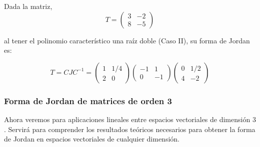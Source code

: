 \bigskip

\begin{example}
Dada la matriz, 
$$T= \left(\begin{array}{cc} 3 & -2  \\ 8  & -5 
\end{array}
 \right)$$ 
 
\bigskip
\noindent
al tener el polinomio característico una raíz doble (Caso II), su forma de Jordan es: 
 
$$T= CJC^{-1}= \left(\begin{array}{cc} 1 & 1/4  \\ 2  & 0 
\end{array}
 \right) \left(\begin{array}{cc} -1 & 1  \\ 0  & -1 
\end{array}
 \right) \left(\begin{array}{cc} 0 & 1/2  \\ 4  & -2 
\end{array}
 \right) $$
\end{example}

\bigskip



\subsubsection{Forma de Jordan de matrices de orden 3} 



\bigskip

Ahora veremos para   aplicaciones lineales entre espacios vectoriales de dimensión $3$. Servirá para comprender los resultados teóricos necesarios para obtener la forma de Jordan en espacios vectoriales de cualquier dimensión.

\bigskip

